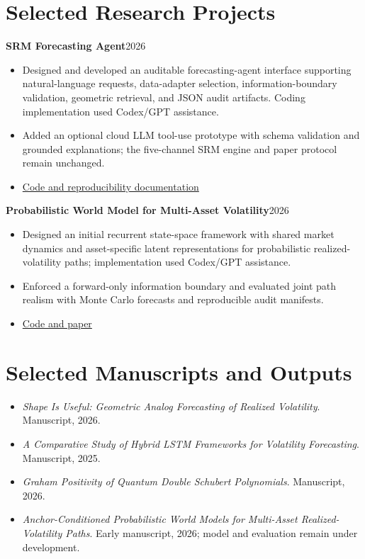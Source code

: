 \documentclass[10pt]{article}
\newcommand{\entry}[2]{\textbf{#1}\hfill #2\\}
\begin{document}
\section*{Selected Research Projects}
\entry{SRM Forecasting Agent}{2026}
\begin{itemize}
\item Designed and developed an auditable forecasting-agent interface supporting natural-language requests, data-adapter selection, information-boundary validation, geometric retrieval, and JSON audit artifacts. Coding implementation used Codex/GPT assistance.
\item Added an optional cloud LLM tool-use prototype with schema validation and grounded explanations; the five-channel SRM engine and paper protocol remain unchanged.
\item \href{https://github.com/xtr1976536/srm-forecasting-agent}{Code and reproducibility documentation}
\end{itemize}
\entry{Probabilistic World Model for Multi-Asset Volatility}{2026}
\begin{itemize}
\item Designed an initial recurrent state-space framework with shared market dynamics and asset-specific latent representations for probabilistic realized-volatility paths; implementation used Codex/GPT assistance.
\item Enforced a forward-only information boundary and evaluated joint path realism with Monte Carlo forecasts and reproducible audit manifests.
\item \href{https://github.com/xtr1976536/volatility-world-model}{Code and paper}
\end{itemize}
\section*{Selected Manuscripts and Outputs}
\begin{itemize}
\item \textit{Shape Is Useful: Geometric Analog Forecasting of Realized Volatility}. Manuscript, 2026.
\item \textit{A Comparative Study of Hybrid LSTM Frameworks for Volatility Forecasting}. Manuscript, 2025.
\item \textit{Graham Positivity of Quantum Double Schubert Polynomials}. Manuscript, 2026.
\item \textit{Anchor-Conditioned Probabilistic World Models for Multi-Asset Realized-Volatility Paths}. Early manuscript, 2026; model and evaluation remain under development.
\end{itemize}
\end{document}
